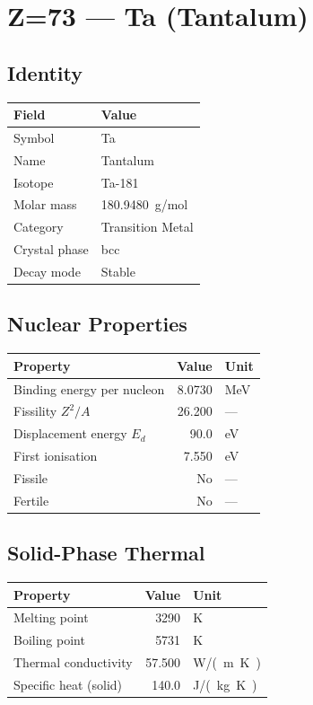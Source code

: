 \documentclass[11pt,a4paper]{article}
\begin{document}
\newpage

\section{Z=73 --- Ta (Tantalum)}
\label{sec:Z73}

\subsection{Identity}
\begin{tabular}{ll}
  \toprule
  Field & Value \\
  \midrule
  Symbol & Ta \\
  Name & Tantalum \\
  Isotope & Ta-181 \\
  Molar mass & \SI{180.9480}{g/mol} \\
  Category & Transition Metal \\
  Crystal phase & bcc \\
  Decay mode & Stable \\
  \bottomrule
\end{tabular}

\subsection{Nuclear Properties}
\begin{tabular}{lrl}
  \toprule
  Property & Value & Unit \\
  \midrule
  Binding energy per nucleon & 8.0730 & \si{MeV} \\
  Fissility $Z^2/A$ & 26.200 & --- \\
  Displacement energy $E_d$ & 90.0 & \si{eV} \\
  First ionisation & 7.550 & \si{eV} \\
  Fissile & No & --- \\
  Fertile & No & --- \\
  \bottomrule
\end{tabular}

\subsection{Solid-Phase Thermal}
\begin{tabular}{lrl}
  \toprule
  Property & Value & Unit \\
  \midrule
  Melting point & 3290 & \si{K} \\
  Boiling point & 5731 & \si{K} \\
  Thermal conductivity & 57.500 & \si{W/(m.K)} \\
  Specific heat (solid) & 140.0 & \si{J/(kg.K)} \\
  \bottomrule
\end{tabular}
\end{document}
